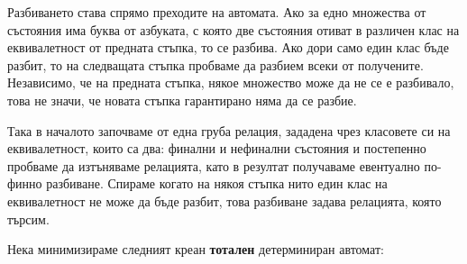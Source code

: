 \documentclass[12pt]{article}
\begin{document}
Разбиването става спрямо преходите на автомата. Ако за едно множества от състояния има буква от азбуката, с която две състояния отиват в различен клас на еквивалетност от предната стъпка, то се разбива. Ако дори само един клас бъде разбит, то на следващата стъпка пробваме да разбием всеки от получените. Независимо, че на предната стъпка, някое множество може да не се е разбивало, това не значи, че новата стъпка гарантирано няма да се разбие.

\vspace*{3mm}

\par Така в началото започваме от една груба релация, зададена чрез класовете си на еквивалетност, които са два: финални и нефинални състояния и постепенно пробваме да изтъняваме релацията, като в резултат получаваме евентуално по-финно разбиване. Спираме когато на някоя стъпка нито един клас на еквивалетност не може да бъде разбит, това разбиване задава релацията, която търсим.

\vspace*{3mm}

\par Нека минимизираме следният креан \textbf{тотален} детерминиран автомат:

\begin{center}
\end{center}
\end{document}
